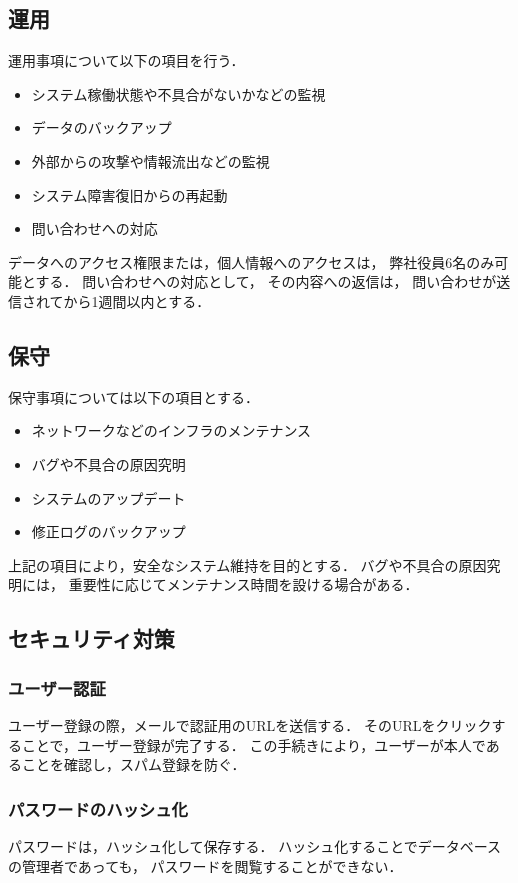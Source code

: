 \documentclass[a4paper,dvipdfmx]{jarticle}
\begin{document}
\subsection{運用}
運用事項について以下の項目を行う．\par
\begin{itemize}
  \item システム稼働状態や不具合がないかなどの監視
  \item データのバックアップ
  \item 外部からの攻撃や情報流出などの監視
  \item システム障害復旧からの再起動
  \item 問い合わせへの対応
\end{itemize}\par
データへのアクセス権限または，個人情報へのアクセスは，
弊社役員6名のみ可能とする．
問い合わせへの対応として，
その内容への返信は，
問い合わせが送信されてから1週間以内とする．\par
\par


\subsection{保守}
保守事項については以下の項目とする．\par
\begin{itemize}
  \item ネットワークなどのインフラのメンテナンス
  \item バグや不具合の原因究明
  \item システムのアップデート
  \item 修正ログのバックアップ
\end{itemize}\par
上記の項目により，安全なシステム維持を目的とする．
バグや不具合の原因究明には，
重要性に応じてメンテナンス時間を設ける場合がある．\par

\subsection{セキュリティ対策}
\subsubsection{ユーザー認証}
ユーザー登録の際，メールで認証用のURLを送信する．
そのURLをクリックすることで，ユーザー登録が完了する．
この手続きにより，ユーザーが本人であることを確認し，スパム登録を防ぐ．
\subsubsection{パスワードのハッシュ化}
パスワードは，ハッシュ化して保存する．
ハッシュ化することでデータベースの管理者であっても，
パスワードを閲覧することができない．\par
\end{document}

